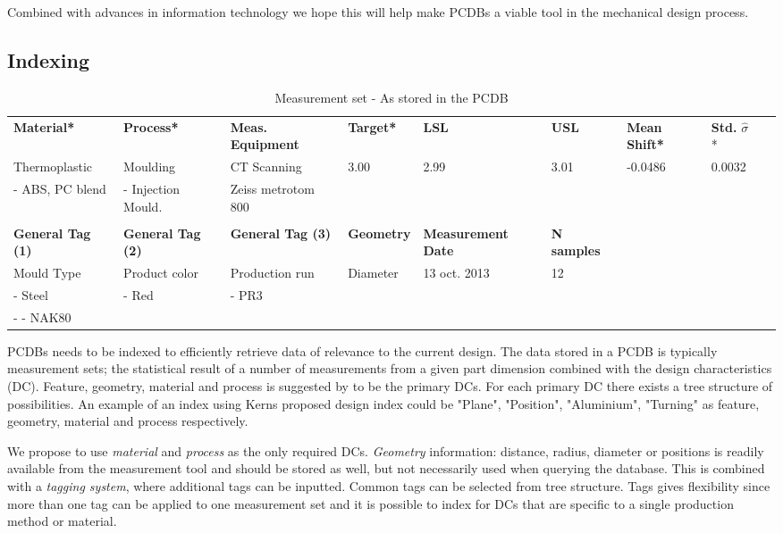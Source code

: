 \documentclass[aip,amsmath, preprint, author-year]{revtex4-1}
\begin{document}
Combined with advances in information technology we hope this will help make PCDBs a viable tool in the mechanical design process. 

\subsection{Indexing}

\begingroup
\squeezetable

\begin{table}
\begin{ruledtabular}
\caption{\label{tab:sampleset} Measurement set - As stored in the PCDB}
\begin{tabular}{lllllllll}
\textbf{Material*} 		& \textbf{Process*} 		& \textbf{Meas. Equipment}  	& \textbf{Target*} 	& \textbf{LSL} 	& \textbf{USL} 	& \textbf{Mean Shift*} 	& \textbf{Std.}   $\hat{\sigma}$ * & 	\\
Thermoplastic 			& Moulding			& CT Scanning				& 3.00			& 2.99		& 3.01		& -0.0486			& 0.0032				\\
 - ABS, PC blend		& - Injection Mould.		& Zeiss metrotom 800	\\
\\
\textbf{General Tag (1)} 	& \textbf{General Tag (2)} & \textbf{General Tag (3)} 	& \textbf{Geometry}		& \textbf{Measurement Date} 	& \textbf{N samples} 	\\
Mould Type			& Product color			& Production run			& Diameter				& 13 oct. 2013  			& 12\\
- Steel 				& - Red				& - PR3				\\
- - NAK80 
\end{tabular}%
\end{ruledtabular}
\end{table}
\endgroup


PCDBs needs to be indexed to efficiently retrieve data of relevance to the current design. 
The data stored in a PCDB is typically measurement sets; the statistical result of a number of measurements from a given part dimension combined with the design characteristics (DC). 
Feature, geometry, material and process is suggested by \cite{kern2003forecasting} to be the primary DCs. 
For each primary DC there exists a tree structure of possibilities. An example of an index using Kerns proposed design index could be "Plane", "Position", "Aluminium", "Turning" as feature, geometry, material and process respectively. 

We propose to use \emph{material} and \emph{process} as the only required DCs. 
\emph{Geometry} information: distance, radius, diameter or positions is readily available from the measurement tool and should be stored as well, but not necessarily used when querying the database.
This is combined with a \emph{tagging system}, where additional tags can be inputted. 
Common tags can be selected from tree structure. 
Tags gives flexibility since more than one tag can be applied to one measurement set and it is possible to index for DCs that are specific to a single production method or material. 
\end{document}
